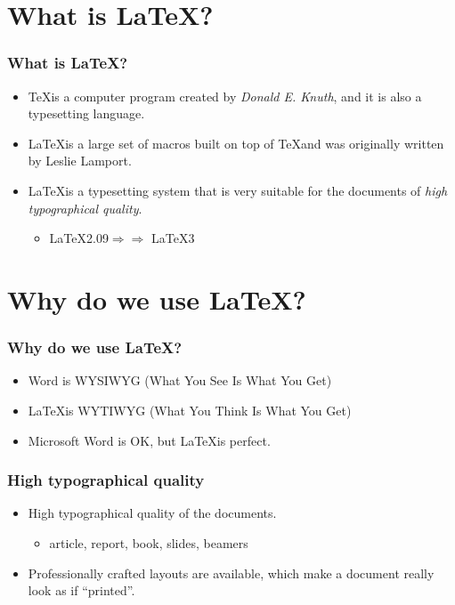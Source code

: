 \documentclass[notheorems,serif,table,compress]{beamer}  %
\begin{document}
\section{What is \LaTeX ?}

%
\begin{frame}
\frametitle{What is \LaTeX ?}
\begin{itemize}
\item \TeX \;is a computer program created by \emph{Donald E. Knuth}, and it is also a typesetting language.
\item \LaTeX \;is a large set of macros built on top of \TeX \;and was originally written by Leslie Lamport. 
\item \LaTeX \;is a typesetting system that is very suitable for the documents of \emph{high typographical quality}.
\begin{itemize}
\item \LaTeX 2.09$\Rightarrow$\LaTeXe\;$\Rightarrow$ \LaTeX3
\end{itemize}
\end{itemize}

\end{frame}

\section{Why do we use \LaTeX?}

%
\begin{frame}
\frametitle{Why do we use \LaTeX?}
\begin{itemize}
\item<1-> Word is {\color{blue}WYSIWYG} (What You See Is What You Get)
\item<2-> \LaTeX \;is {\color{blue}WYTIWYG} (What You Think Is What You Get)
\item<3> Microsoft Word is OK, but \LaTeX \;is perfect.
\end{itemize}

\end{frame}

%
\begin{frame}
\frametitle{High typographical quality}
\begin{itemize} 
\item {\color{blue}High typographical quality} of the documents.
\begin{itemize} 
\item article, report, book, slides, beamers
\end{itemize}
\item Professionally crafted layouts are available, which make a document really look as if ``{\color{blue}printed}''.
\end{itemize}

\end{frame}
\end{document}
